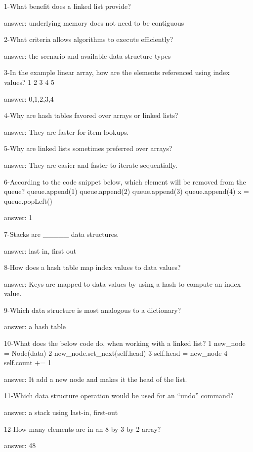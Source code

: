 1-What benefit does a linked list provide?


answer: underlying memory does not need to be contiguous

2-What criteria allows algorithms to execute efficiently?


answer: the scenario and available data structure types

3-In the example linear array, how are the elements referenced using index values? 
1 2 3 4 5 

answer: 0,1,2,3,4

4-Why are hash tables favored over arrays or linked lists?


answer: They are faster for item lookups.

5-Why are linked lists sometimes preferred over arrays?


answer: They are easier and faster to iterate sequentially.

6-According to the code snippet below, which element will be removed from the queue?
queue.append(1)
queue.append(2)
queue.append(3)
queue.append(4)
x = queue.popLeft()

answer: 1

7-Stacks are _____ data structures.


answer: last in, first out

8-How does a hash table map index values to data values?


answer: Keys are mapped to data values by using a hash to compute an index value.

9-Which data structure is most analogous to a dictionary?


answer: a hash table

10-What does the below code do, when working with a linked list?
1 new_node = Node(data)
2 new_node.set_next(self.head)
3 self.head = new_node
4 self.count += 1


answer: It add a new node and makes it the head of the list.

11-Which data structure operation would be used for an “undo” command?


answer: a stack using last-in, first-out

12-How many elements are in an 8 by 3 by 2 array?


answer: 48
